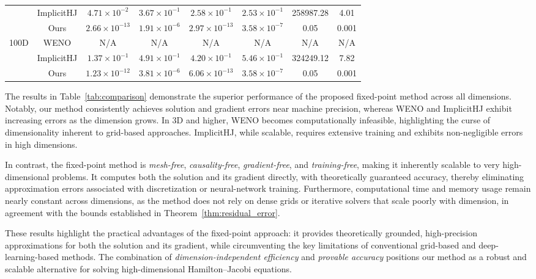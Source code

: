\documentclass[review,hidelinks,onefignum,onetabnum]{siamart250106}
\begin{document}
\begin{table}[t]
{\begin{tabular}{c|c|cccccc}
    & ImplicitHJ & $4.71\times10^{-2}$ & $3.67\times10^{-1}$ & $2.58\times10^{-1}$ & $2.53\times10^{-1}$ & 258987.28 & 4.01 \\
    & Ours & $2.66\times10^{-13}$ & $1.91\times10^{-6}$ & $2.97\times10^{-13}$ & $3.58\times10^{-7}$ & 0.05 & 0.001 \\
\hline
100D & WENO & N/A & N/A & N/A & N/A & N/A & N/A \\
     & ImplicitHJ & $1.37\times10^{-1}$ & $4.91\times10^{-1}$ & $4.20\times10^{-1}$ & $5.46\times10^{-1}$ & 324249.12 & 7.82 \\
     & Ours & $1.23\times10^{-12}$ & $3.81\times10^{-6}$ & $6.06\times10^{-13}$ & $3.58\times10^{-7}$ & 0.05 & 0.001 \\
\hline
\end{tabular}}
\end{table}

The results in Table~\ref{tab:comparison} demonstrate the superior performance of the proposed fixed-point method across all dimensions. Notably, our method consistently achieves solution and gradient errors near machine precision, whereas WENO and ImplicitHJ exhibit increasing errors as the dimension grows. In 3D and higher, WENO becomes computationally infeasible, highlighting the curse of dimensionality inherent to grid-based approaches. ImplicitHJ, while scalable, requires extensive training and exhibits non-negligible errors in high dimensions.  

In contrast, the fixed-point method is \emph{mesh-free}, \emph{causality-free}, \emph{gradient-free}, and \emph{training-free}, making it inherently scalable to very high-dimensional problems. It computes both the solution and its gradient directly, with theoretically guaranteed accuracy, thereby eliminating approximation errors associated with discretization or neural-network training. Furthermore, computational time and memory usage remain nearly constant across dimensions, as the method does not rely on dense grids or iterative solvers that scale poorly with dimension, in agreement with the bounds established in Theorem~\ref{thm:residual_error}.

These results highlight the practical advantages of the fixed-point approach: it provides theoretically grounded, high-precision approximations for both the solution and its gradient, while circumventing the key limitations of conventional grid-based and deep-learning-based methods. The combination of \emph{dimension-independent efficiency} and \emph{provable accuracy} positions our method as a robust and scalable alternative for solving high-dimensional Hamilton--Jacobi equations.
\end{document}
